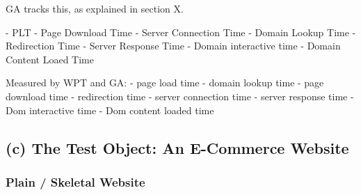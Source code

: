 GA tracks this, as explained in section X.

- PLT
- Page Download Time
- Server Connection Time
- Domain Lookup Time
- Redirection Time
- Server Response Time
- Domain interactive time
- Domain Content Loaed Time



Measured by WPT and GA:
- page load time
- domain lookup time
- page download time
- redirection time
- server connection time
- server response time
- Dom interactive time
- Dom content loaded time





\subsection{(c) The Test Object: An E-Commerce Website}








\subsubsection{Plain / Skeletal Website}


    
